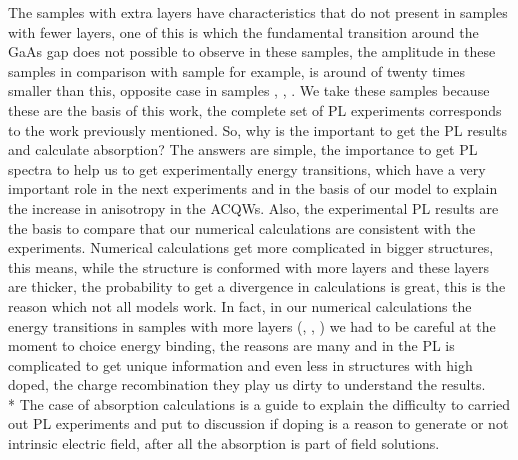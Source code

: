 The samples with extra layers have characteristics that do not present in samples with fewer layers, one of this is which the fundamental transition around the GaAs gap does not possible to observe in these samples, the amplitude in these samples in comparison with sample  for example, is around of twenty times smaller than this, opposite case in samples , , . We take these samples because these are the basis of this work, the complete set of PL experiments corresponds to the work previously mentioned. So, why is the important to get the PL results and calculate absorption?
The answers are simple, the importance to get PL spectra to help us to get experimentally energy transitions, which have a very important role in the next experiments and in the basis of our model to explain the increase in anisotropy in the ACQWs.  Also, the experimental PL results are the basis to compare that our numerical calculations are consistent with the experiments. Numerical calculations get more complicated in bigger structures, this means, while the structure is conformed with more layers and these layers are thicker, the probability to get a divergence in calculations is great, this is the reason which not all models work. In fact, in our numerical calculations the energy transitions in samples with more layers (, , ) we had to be careful at the moment to choice energy binding, the reasons are many and in the PL is complicated to get unique information and even less in structures with high doped, the charge recombination they play us dirty to understand the results. \\*
The case of absorption calculations is a guide to explain the difficulty to carried out PL experiments and put to discussion if doping is a reason to generate or not intrinsic electric field, after all the absorption is part of field solutions. 

